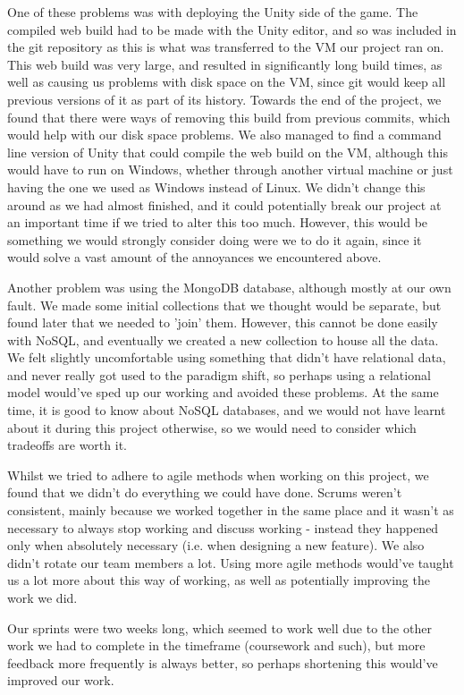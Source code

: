 One of these problems was with deploying the Unity side of the game. The
compiled web build had to be made with the Unity editor, and so was included in
the git repository as this is what was transferred to the VM our project ran on.
This web build was very large, and resulted in significantly long build times,
as well as causing us problems with disk space on the VM, since git would keep
all previous versions of it as part of its history. Towards the end of the
project, we found that there were ways of removing this build from previous
commits, which would help with our disk space problems. We also managed to find
a command line version of Unity that could compile the web build on the VM,
although this would have to run on Windows, whether through another virtual
machine or just having the one we used as Windows instead of Linux. We didn't
change this around as we had almost finished, and it could potentially break our
project at an important time if we tried to alter this too much. However, this
would be something we would strongly consider doing were we to do it again,
since it would solve a vast amount of the annoyances we encountered above.

Another problem was using the MongoDB database, although mostly at our own
fault. We made some initial collections that we thought would be separate, but
found later that we needed to 'join' them. However, this cannot be done easily
with NoSQL, and eventually we created a new collection to house all the data. We
felt slightly uncomfortable using something that didn't have relational data,
and never really got used to the paradigm shift, so perhaps using a relational
model would've sped up our working and avoided these problems. At the same time,
it is good to know about NoSQL databases, and we would not have learnt about it
during this project otherwise, so we would need to consider which tradeoffs are
worth it.

Whilst we tried to adhere to agile methods when working on this project, we
found that we didn't do everything we could have done. Scrums weren't
consistent, mainly because we worked together in the same place and it wasn't as
necessary to always stop working and discuss working - instead they happened
only when absolutely necessary (i.e. when designing a new feature). We also
didn't rotate our team members a lot. Using more agile methods would've taught
us a lot more about this way of working, as well as potentially improving the
work we did.

Our sprints were two weeks long, which seemed to work well due to the other work
we had to complete in the timeframe (coursework and such), but more feedback
more frequently is always better, so perhaps shortening this would've improved
our work.

